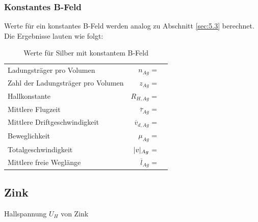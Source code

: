 \subsubsection{Konstantes B-Feld} \label{sec:5.4.2}

\justifying Werte für ein konstantes B-Feld werden analog zu Abschnitt \ref{sec:5.3} berechnet. Die Ergebnisse lauten wie folgt:

\begin{table}[H]
\centering
    \begin{tabular}{l r l}
    \toprule
        Ladungsträger pro Volumen               &$n_{Ag}$               = & \text{}  \\
        Zahl der Ladungsträger pro Volumen      &$z_{Ag}$               = & \text{}  \\
        Hallkonstante                           &$R_{H,Ag}$             = & \text{} \\
        Mittlere Flugzeit                       &$\overline{\tau}_{Ag}$ = & \text{}\\
        Mittlere Driftgeschwindigkeit           &$\overline{v}_{d,Ag}$  = & \text{}\\
        Beweglichkeit                           &$\mu_{Ag}$             = & \text{} \\
        Totalgeschwindigkeit                    &$\lvert v\rvert_{Ag}$         = & \text{}  \\
        Mittlere freie Weglänge                 &$\overline{l}_{Ag}$    = & \text{}  \\
        \bottomrule
    \end{tabular}
\caption{Werte für Silber mit konstantem B-Feld}
\label{tab:7}
\end{table}

\subsection{Zink} \label{sec:5.5}

\begin{table}[H]
    \centering
    
    \caption{Hallspannung $U_H$ von Zink}
    \label{tab:8}
\end{table}

